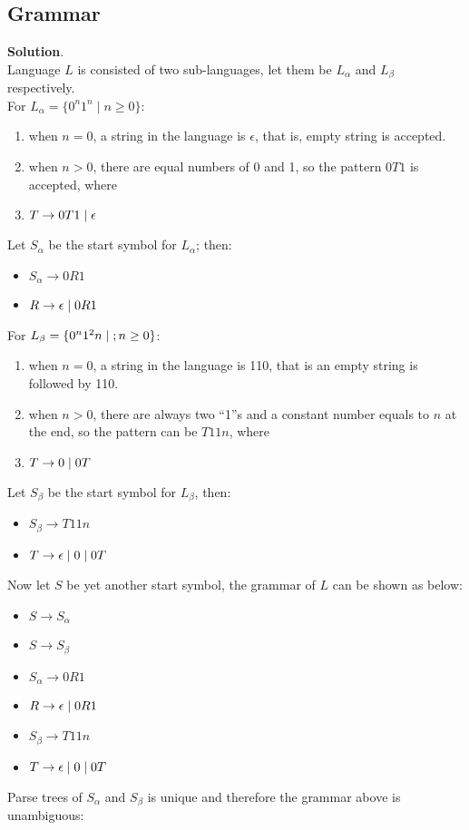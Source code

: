 \subsection{Grammar}
\textbf{Solution}.\\
Language \(L\) is consisted of two sub-languages, let them be \(L_{\alpha}\) and \(L_{\beta}\) respectively.\\
For \(L_{\alpha} = \{0^{n}1^{n}\;|\; n \geq 0\}\):
\begin{enumerate}[itemsep=0pt]
\item when \(n = 0\), a string in the language is \(\epsilon\), that is, empty string is accepted.
\item when \(n > 0\), there are equal numbers of 0 and 1, so the pattern \(0T1\) is accepted, where
\item[] \(T \rightarrow 0T1 \;|\; \epsilon\)
\end{enumerate}
Let \(S_{\alpha}\) be the start symbol for \(L_{\alpha}\); then:
\begin{itemize}[itemsep=0pt]
\item[] \(S_{\alpha} \rightarrow 0R1 \)
\item[] \(R \rightarrow \epsilon \;|\; 0R1 \)
\end{itemize}
For \(L_{\beta} = \{0^{n}1^{2}n \;|\;; n \geq 0\}\):
\begin{enumerate}[itemsep=0pt]
\item when \(n = 0\), a string in the language is 110, that is an empty string is followed by 110.
\item when \(n > 0\), there are always two ``1''s and a constant number equals to \(n\) at the end, so the pattern can be \(T11n\), where
\item[]  \(T \rightarrow 0 \;|\; 0T \)
\end{enumerate}
Let \(S_{\beta}\) be the start symbol for \(L_{\beta}\), then:
\begin{itemize}[itemsep=0pt]
\item[] \(S_{\beta} \rightarrow T11n \)
\item[] \(T \rightarrow \epsilon \;|\; 0 \;|\; 0T \)
\end{itemize}
Now let \(S\) be yet another start symbol, the grammar of \(L\) can be shown as below:
\begin{itemize}[itemsep=0pt]
\item[] \(S \rightarrow S_{\alpha} \)
\item[] \(S \rightarrow S_{\beta} \)
\item[] \(S_{\alpha} \rightarrow 0R1 \)
\item[] \(R \rightarrow \epsilon \;|\; 0R1 \)
\item[] \(S_{\beta} \rightarrow T11n \)
\item[] \(T \rightarrow \epsilon \;|\; 0 \;|\; 0T \)
\end{itemize}
Parse trees of \(S_{\alpha}\) and \(S_{\beta}\) is unique and therefore the grammar above is unambiguous:

